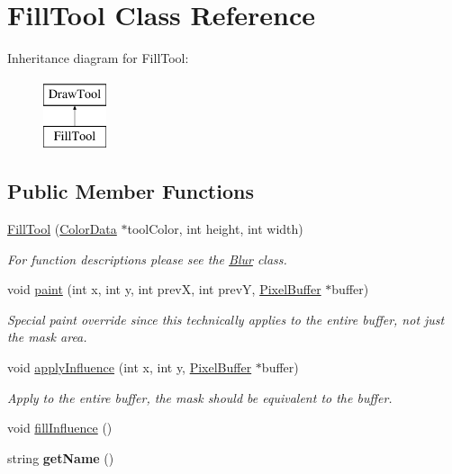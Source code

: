\hypertarget{classFillTool}{}\section{Fill\+Tool Class Reference}
\label{classFillTool}
Inheritance diagram for Fill\+Tool\+:\begin{figure}[H]
\begin{center}
\leavevmode
\includegraphics[height=2.000000cm]{classFillTool}
\end{center}
\end{figure}
\subsection*{Public Member Functions}
\begin{DoxyCompactItemize}
\item 
\hyperlink{classFillTool_a6abe3f5032f5e69a11cf38b94da90a62}{Fill\+Tool} (\hyperlink{classColorData}{Color\+Data} $\ast$tool\+Color, int height, int width)
\begin{DoxyCompactList}\small\item\em For function descriptions please see the \hyperlink{classBlur}{Blur} class. \end{DoxyCompactList}\item 
void \hyperlink{classFillTool_a81a3a46e5600d6250634766e8b769796}{paint} (int x, int y, int prevX, int prevY, \hyperlink{classPixelBuffer}{Pixel\+Buffer} $\ast$buffer)\hypertarget{classFillTool_a81a3a46e5600d6250634766e8b769796}{}\label{classFillTool_a81a3a46e5600d6250634766e8b769796}

\begin{DoxyCompactList}\small\item\em Special paint override since this technically applies to the entire buffer, not just the mask area. \end{DoxyCompactList}\item 
void \hyperlink{classFillTool_a8ad4d0d5b2a5379be3720c89a102ddb3}{apply\+Influence} (int x, int y, \hyperlink{classPixelBuffer}{Pixel\+Buffer} $\ast$buffer)\hypertarget{classFillTool_a8ad4d0d5b2a5379be3720c89a102ddb3}{}\label{classFillTool_a8ad4d0d5b2a5379be3720c89a102ddb3}

\begin{DoxyCompactList}\small\item\em Apply to the entire buffer, the mask should be equivalent to the buffer. \end{DoxyCompactList}\item 
void \hyperlink{classFillTool_a888fd877cf0937e9b36be2d56f06de3e}{fill\+Influence} ()
\item 
string {\bfseries get\+Name} ()\hypertarget{classFillTool_a7466c932b389d32e4a200763ccb087be}{}\label{classFillTool_a7466c932b389d32e4a200763ccb087be}

\end{DoxyCompactItemize}
